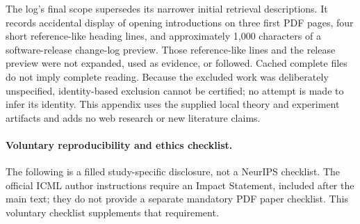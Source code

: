The log's final scope supersedes its narrower initial retrieval descriptions. It records accidental display of opening introductions on three first PDF pages, four short reference-like heading lines, and approximately 1,000 characters of a software-release change-log preview. Those reference-like lines and the release preview were not expanded, used as evidence, or followed. Cached complete files do not imply complete reading. Because the excluded work was deliberately unspecified, identity-based exclusion cannot be certified; no attempt is made to infer its identity. This appendix uses the supplied local theory and experiment artifacts and adds no web research or new literature claims.

\paragraph{Voluntary reproducibility and ethics checklist.}
The following is a filled study-specific disclosure, not a NeurIPS checklist. The official ICML author instructions require an Impact Statement, included after the main text; they do not provide a separate mandatory PDF paper checklist. This voluntary checklist supplements that requirement.
